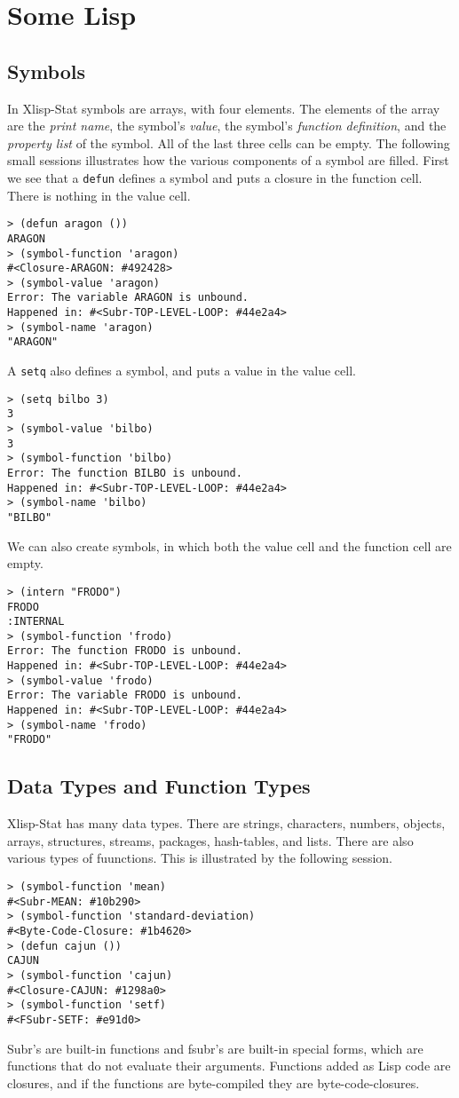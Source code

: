 \documentclass{amsart}
\theoremstyle{definition}
\theoremstyle{remark}
\numberwithin{equation}{section}
\begin{document}
\section{Some Lisp}
%
\subsection{Symbols}
%
In Xlisp-Stat symbols are arrays, with four elements. The
elements of the array are the \emph{print name}, the symbol's \emph{value}, 
the symbol's \emph{function definition}, and the
\emph{property list} of the symbol. All of the last three cells
can be empty. The following small sessions illustrates how the
various components of a symbol are filled. First
we see that a \texttt{defun} defines a symbol and puts a closure in
the function cell. There is nothing in the value cell.
\begin{verbatim}
> (defun aragon ())
ARAGON
> (symbol-function 'aragon)
#<Closure-ARAGON: #492428>
> (symbol-value 'aragon)
Error: The variable ARAGON is unbound.
Happened in: #<Subr-TOP-LEVEL-LOOP: #44e2a4>
> (symbol-name 'aragon)
"ARAGON"
\end{verbatim}
A \texttt{setq} also defines a symbol, and puts a value in the
value cell.
\begin{verbatim}
> (setq bilbo 3)
3
> (symbol-value 'bilbo)
3
> (symbol-function 'bilbo)
Error: The function BILBO is unbound.
Happened in: #<Subr-TOP-LEVEL-LOOP: #44e2a4>
> (symbol-name 'bilbo)
"BILBO"
\end{verbatim}
We can also create symbols, in which both the value cell and
the function cell are empty.
\begin{verbatim}
> (intern "FRODO")
FRODO
:INTERNAL
> (symbol-function 'frodo)
Error: The function FRODO is unbound.
Happened in: #<Subr-TOP-LEVEL-LOOP: #44e2a4>
> (symbol-value 'frodo)
Error: The variable FRODO is unbound.
Happened in: #<Subr-TOP-LEVEL-LOOP: #44e2a4>
> (symbol-name 'frodo)
"FRODO"
\end{verbatim}
%
\subsection{Data Types and Function Types}
%
Xlisp-Stat has many data types. There are strings, characters,
numbers, objects, arrays, structures, streams, packages, hash-tables,
and lists. There are also various types of fuunctions. This is illustrated
by the following session.
\begin{verbatim}
> (symbol-function 'mean)
#<Subr-MEAN: #10b290>
> (symbol-function 'standard-deviation)
#<Byte-Code-Closure: #1b4620>
> (defun cajun ()) 
CAJUN
> (symbol-function 'cajun)
#<Closure-CAJUN: #1298a0>
> (symbol-function 'setf)
#<FSubr-SETF: #e91d0>
\end{verbatim}
%
Subr's are built-in functions and fsubr's are built-in special
forms, which are functions that do not evaluate their
arguments.  Functions added as Lisp code are closures, and
if the functions are byte-compiled they are byte-code-closures. 
%
\end{document}
